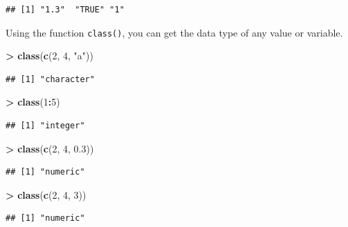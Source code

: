 \documentclass[]{book}
\newenvironment{Shaded}{\begin{snugshade}}{\end{snugshade}}
\newcommand{\DecValTok}[1]{\textcolor[rgb]{0.00,0.00,0.81}{#1}}
\newcommand{\FloatTok}[1]{\textcolor[rgb]{0.00,0.00,0.81}{#1}}
\newcommand{\KeywordTok}[1]{\textcolor[rgb]{0.13,0.29,0.53}{\textbf{#1}}}
\newcommand{\NormalTok}[1]{#1}
\newcommand{\OperatorTok}[1]{\textcolor[rgb]{0.81,0.36,0.00}{\textbf{#1}}}
\newcommand{\StringTok}[1]{\textcolor[rgb]{0.31,0.60,0.02}{#1}}
\begin{document}
\begin{verbatim}
## [1] "1.3"  "TRUE" "1"
\end{verbatim}

Using the function \texttt{class()}, you can get the data type of any value or variable.

\begin{Shaded}
\begin{Highlighting}[]
\OperatorTok{>}\StringTok{ }\KeywordTok{class}\NormalTok{(}\KeywordTok{c}\NormalTok{(}\DecValTok{2}\NormalTok{, }\DecValTok{4}\NormalTok{, }\StringTok{"a"}\NormalTok{))}
\end{Highlighting}
\end{Shaded}

\begin{verbatim}
## [1] "character"
\end{verbatim}

\begin{Shaded}
\begin{Highlighting}[]
\OperatorTok{>}\StringTok{ }\KeywordTok{class}\NormalTok{(}\DecValTok{1}\OperatorTok{:}\DecValTok{5}\NormalTok{)}
\end{Highlighting}
\end{Shaded}

\begin{verbatim}
## [1] "integer"
\end{verbatim}

\begin{Shaded}
\begin{Highlighting}[]
\OperatorTok{>}\StringTok{ }\KeywordTok{class}\NormalTok{(}\KeywordTok{c}\NormalTok{(}\DecValTok{2}\NormalTok{, }\DecValTok{4}\NormalTok{, }\FloatTok{0.3}\NormalTok{))}
\end{Highlighting}
\end{Shaded}

\begin{verbatim}
## [1] "numeric"
\end{verbatim}

\begin{Shaded}
\begin{Highlighting}[]
\OperatorTok{>}\StringTok{ }\KeywordTok{class}\NormalTok{(}\KeywordTok{c}\NormalTok{(}\DecValTok{2}\NormalTok{, }\DecValTok{4}\NormalTok{, }\DecValTok{3}\NormalTok{))}
\end{Highlighting}
\end{Shaded}

\begin{verbatim}
## [1] "numeric"
\end{verbatim}
\end{document}
